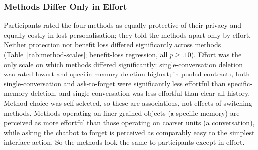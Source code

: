 \documentclass[conference,compsoc]{IEEEtran}
\begin{document}
\subsubsection{Methods Differ Only in Effort}
\label{sec:effort}
Participants rated the four methods as equally protective of their privacy and equally costly in lost personalisation; they told the methods apart only by effort. Neither protection nor benefit loss differed significantly across methods (Table~\ref{tab:method-scales}; benefit-loss regression, all $p\geq.10$). Effort was the only scale on which methods differed significantly: single-conversation deletion was rated lowest and specific-memory deletion highest; in pooled contrasts, both single-conversation and ask-to-forget were significantly less effortful than specific-memory deletion, and single-conversation was less effortful than clear-all-history. Method choice was self-selected, so these are associations, not effects of switching methods. Methods operating on finer-grained objects (a specific memory) are perceived as more effortful than those operating on coarser units (a conversation), while asking the chatbot to forget is perceived as comparably easy to the simplest interface action. So the methods look the same to participants except in effort.
\end{document}
